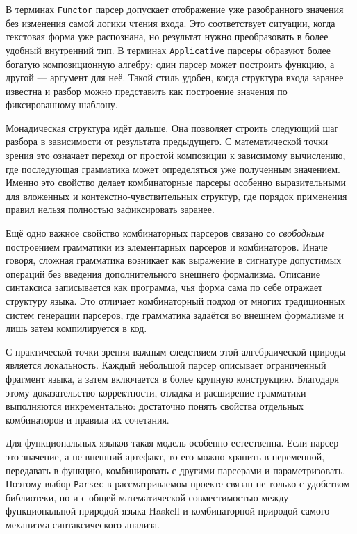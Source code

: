 \documentclass[a4paper,12pt]{article}
\begin{document}
В терминах \texttt{Functor} парсер допускает отображение уже разобранного значения без
изменения самой логики чтения входа. Это соответствует ситуации, когда текстовая форма
уже распознана, но результат нужно преобразовать в более удобный внутренний тип. В
терминах \texttt{Applicative} парсеры образуют более богатую композиционную алгебру:
один парсер может построить функцию, а другой --- аргумент для неё. Такой стиль удобен,
когда структура входа заранее известна и разбор можно представить как построение
значения по фиксированному шаблону.

Монадическая структура идёт дальше. Она позволяет строить следующий шаг разбора в
зависимости от результата предыдущего. С математической точки зрения это означает
переход от простой композиции к зависимому вычислению, где последующая грамматика
может определяться уже полученным значением. Именно это свойство делает комбинаторные
парсеры особенно выразительными для вложенных и контекстно-чувствительных структур, где
порядок применения правил нельзя полностью зафиксировать заранее.

Ещё одно важное свойство комбинаторных парсеров связано со \textit{свободным}
построением грамматики из элементарных парсеров и комбинаторов. Иначе говоря, сложная
грамматика возникает как выражение в сигнатуре допустимых операций без введения
дополнительного внешнего формализма. Описание синтаксиса записывается как программа,
чья форма сама по себе отражает структуру языка. Это отличает комбинаторный подход от
многих традиционных систем генерации парсеров, где грамматика задаётся во внешнем
формализме и лишь затем компилируется в код.

С практической точки зрения важным следствием этой алгебраической природы является
локальность. Каждый небольшой парсер описывает ограниченный фрагмент языка, а затем
включается в более крупную конструкцию. Благодаря этому доказательство корректности,
отладка и расширение грамматики выполняются инкрементально: достаточно понять свойства
отдельных комбинаторов и правила их сочетания.

Для функциональных языков такая модель особенно естественна. Если парсер --- это
значение, а не внешний артефакт, то его можно хранить в переменной, передавать в
функцию, комбинировать с другими парсерами и параметризовать. Поэтому выбор
\texttt{Parsec} в рассматриваемом проекте связан не только с удобством библиотеки, но и
с общей математической совместимостью между функциональной природой языка Haskell и
комбинаторной природой самого механизма синтаксического анализа.
\end{document}
